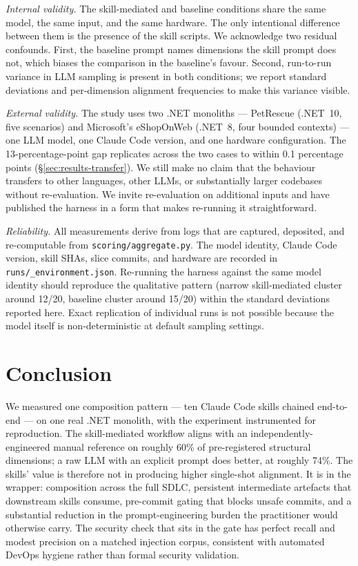 \documentclass[journal]{IEEEtran}
\begin{document}
\textit{Internal validity.} The skill-mediated and baseline
conditions share the same model, the same input, and the same
hardware. The only intentional difference between them is the
presence of the skill scripts. We acknowledge two residual
confounds. First, the baseline prompt names dimensions the skill
prompt does not, which biases the comparison in the baseline's
favour. Second, run-to-run variance in LLM sampling is present in
both conditions; we report standard deviations and per-dimension
alignment frequencies to make this variance visible.

\textit{External validity.} The study uses two .NET monoliths
--- PetRescue (.NET~10, five scenarios) and Microsoft's
eShopOnWeb (.NET~8, four bounded contexts) --- one LLM model, one
Claude Code version, and one hardware configuration. The
13-percentage-point gap replicates across the two cases to within
0.1 percentage points (\S\ref{sec:results-transfer}). We still
make no claim that the behaviour transfers to other languages,
other LLMs, or substantially larger codebases without
re-evaluation. We invite re-evaluation on additional
inputs and have published the harness in a form that makes
re-running it straightforward.

\textit{Reliability.} All measurements derive from logs that are
captured, deposited, and re-computable from
\texttt{scoring/aggregate.py}. The model identity, Claude Code
version, skill SHAs, slice commits, and hardware are recorded in
\texttt{runs/\_environment.json}. Re-running the harness against
the same model identity should reproduce the qualitative pattern
(narrow skill-mediated cluster around 12/20, baseline cluster
around 15/20) within the standard deviations reported here.
Exact replication of individual runs is not possible because the
model itself is non-deterministic at default sampling settings.

\section{Conclusion}
\label{sec:conclusion}

We measured one composition pattern --- ten Claude Code skills
chained end-to-end --- on one real .NET monolith, with the
experiment instrumented for reproduction. The skill-mediated
workflow aligns with an independently-engineered manual reference
on roughly 60\% of pre-registered structural dimensions; a raw
LLM with an explicit prompt does better, at roughly 74\%. The
skills' value is therefore not in producing higher single-shot
alignment. It is in the wrapper: composition across the full
SDLC, persistent intermediate artefacts that downstream skills
consume, pre-commit gating that blocks unsafe commits, and a
substantial reduction in the prompt-engineering burden the
practitioner would otherwise carry. The security check that
sits in the gate has perfect recall and modest precision on a
matched injection corpus, consistent with automated DevOps
hygiene rather than formal security validation.
\end{document}

